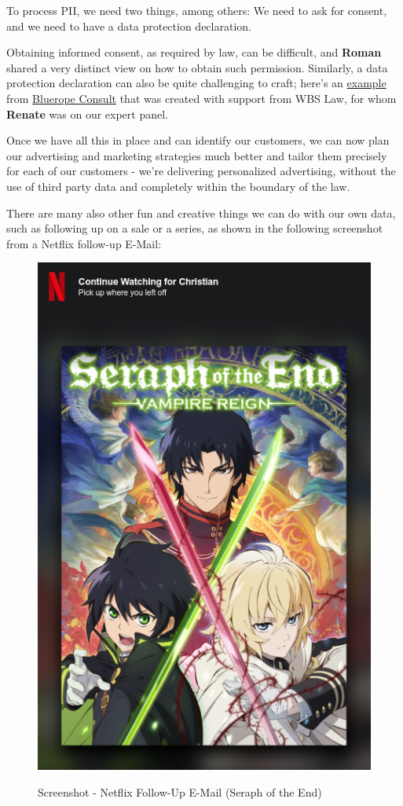 To process PII, we need two things, among others: We need to ask for consent, and we need to have a data protection declaration.

Obtaining informed consent, as required by law, can be difficult, and \textbf{Roman} shared a very distinct view on how to obtain such permission. Similarly, a data protection declaration can also be quite challenging to craft; here's an \href{https://blueropeconsultonline.de/datenschutz/}{example} from \href{https://blueropeconsultonline.de/}{Bluerope Consult} that was created with support from WBS Law, for whom \textbf{Renate} was on our expert panel.

Once we have all this in place and can identify our customers, we can now plan our advertising and marketing strategies much better and tailor them precisely for each of our customers - we're delivering personalized advertising, without the use of third party data and completely within the boundary of the law.

There are many also other fun and creative things we can do with our own data, such as following up on a sale or a series, as shown in the following screenshot from a Netflix follow-up E-Mail:

\begin{figure}[H]
\centering
\caption {Screenshot - Netflix Follow-Up E-Mail (Seraph of the End)}
\includegraphics[scale=0.6]{images/continue-seraph.png}
\label{fig:seraph}
\end{figure}

